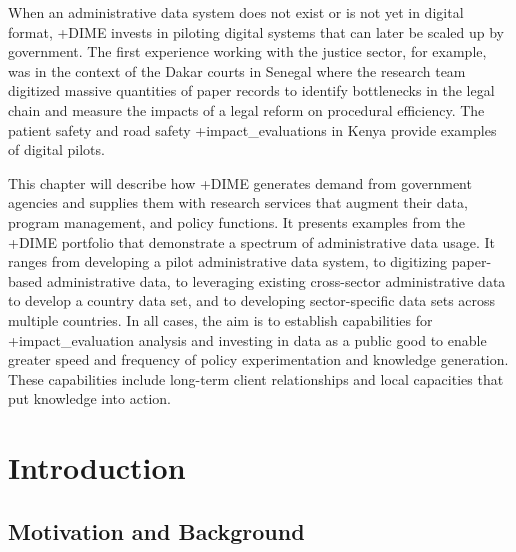 \documentclass[
]{book}
\begin{document}
When an administrative data system does not exist or is not yet in digital format, +DIME\textbar{} invests in piloting digital systems that can later be scaled up by government. The first experience working with the justice sector, for example, was in the context of the Dakar courts in Senegal where the research team digitized massive quantities of paper records to identify bottlenecks in the legal chain and measure the impacts of a legal reform on procedural efficiency. The patient safety and road safety +impact\_evaluations\textbar{} in Kenya provide examples of digital pilots.

This chapter will describe how +DIME\textbar{} generates demand from government agencies and supplies them with research services that augment their data, program management, and policy functions. It presents examples from the +DIME\textbar{} portfolio that demonstrate a spectrum of administrative data usage. It ranges from developing a pilot administrative data system, to digitizing paper-based administrative data, to leveraging existing cross-sector administrative data to develop a country data set, and to developing sector-specific data sets across multiple countries. In all cases, the aim is to establish capabilities for +impact\_evaluation\textbar{} analysis and investing in data as a public good to enable greater speed and frequency of policy experimentation and knowledge generation. These capabilities include long-term client relationships and local capacities that put knowledge into action.

\hypertarget{introduction-8}{%
\section{Introduction}\label{introduction-8}}

\hypertarget{motivation-and-background-7}{%
\subsection{Motivation and Background}\label{motivation-and-background-7}}
\end{document}
